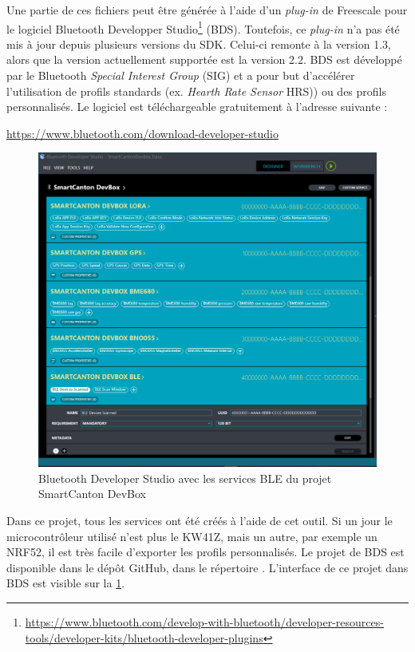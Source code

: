 Une partie de ces fichiers peut être générée à l'aide d'un \textit{plug-in} de Freescale pour le logiciel Bluetooth Developper Studio\footnote{\url{https://www.bluetooth.com/develop-with-bluetooth/developer-resources-tools/developer-kits/bluetooth-developer-plugins}} (BDS). Toutefois, ce \textit{plug-in} n'a pas été mis à jour depuis plusieurs versions du SDK. Celui-ci remonte à la version 1.3, alors que la version actuellement supportée est la version 2.2. BDS est développé par le Bluetooth \textit{Special Interest Group} (SIG) et a pour but d'accélérer l'utilisation de profils standards (ex. \textit{Hearth Rate Sensor} HRS)) ou des profils personnalisés. Le logiciel est téléchargeable gratuitement à l'adresse suivante :

\begin{center}
    \url{https://www.bluetooth.com/download-developer-studio}
\end{center}

\begin{figure}[ht!]
    \centering
    \includegraphics[width=1.0\textwidth]{Figures/Software/kw41z/bds_interface_smartcanton.png}
    \caption{Bluetooth Developer Studio avec les services BLE du projet SmartCanton DevBox}
    \label{fig-bds_interface_smartcanton}
\end{figure}

Dans ce projet, tous les services ont été créés à l'aide de cet outil. Si un jour le microcontrôleur utilisé n'est plus le KW41Z, mais un autre, par exemple un NRF52, il est très facile d'exporter les profils personnalisés. Le projet de BDS est disponible dans le dépôt GitHub, dans le répertoire . L'interface de ce projet dans BDS est visible sur la \cref{fig-bds_interface_smartcanton}. \\


